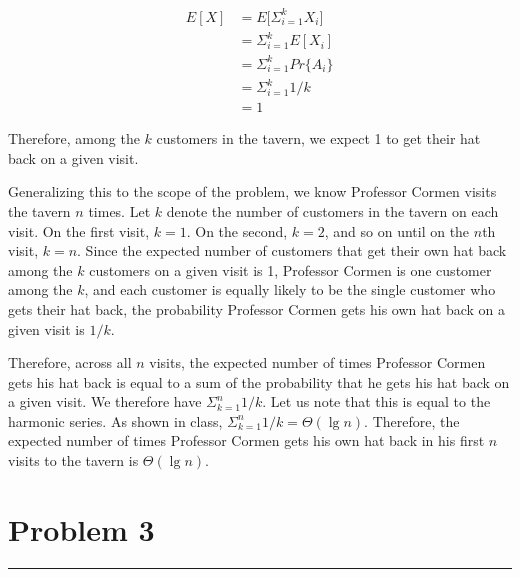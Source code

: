 \documentclass[11pt]{article}
\def\separateline{\medskip\hrule\medskip}
\begin{document}
\begin{equation}
\begin{split}
E[X] &= E\Big[ \Sigma_{i=1}^{k}{X_i}\Big]\\
     &= \Sigma_{i=1}^{k}{E[X_i]}\\
     &= \Sigma_{i=1}^{k}{Pr\{A_i\}}\\
     &= \Sigma_{i=1}^{k}{1/k}\\
     &= 1
\end{split}
\end{equation}

Therefore, among the $k$ customers in the tavern, we expect 1 to get their hat back on a given visit.

Generalizing this to the scope of the problem, we know Professor Cormen visits the tavern $n$ times. Let $k$ denote the number of customers in the tavern on each visit. On the first visit, $k=1$. On the second, $k=2$, and so on until on the $n$th visit, $k=n$. Since the expected number of customers that get their own hat back among the $k$ customers on a given visit is 1, Professor Cormen is one customer among the $k$, and each customer is equally likely to be the single customer who gets their hat back, the probability Professor Cormen gets his own hat back on a given visit is $1/k$.

Therefore, across all $n$ visits, the expected number of times Professor Cormen gets his hat back is equal to a sum of the probability that he gets his hat back on a given visit. We therefore have $\Sigma_{k=1}^{n}{1/k}$. Let us note that this is equal to the harmonic series. As shown in class, $\Sigma_{k=1}^{n}{1/k} = \Theta(\lg{n})$. Therefore, the expected number of times Professor Cormen gets his own hat back in his first $n$ visits to the tavern is $\Theta(\lg{n})$.

\newpage

\section{Problem 3}
\separateline
\end{document}
